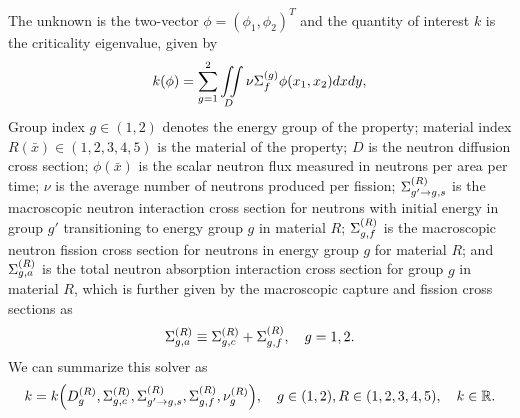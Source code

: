 The unknown is the two-vector $\phi=(\phi_1,\phi_2)^T$ and the quantity of interest $k$ is the criticality eigenvalue, given by
\begin{equation}
k(\phi)=\sum_{g=1}^2\iint\limits_D\nu\Sigma_{f}^{(g)}\phi(x_1,x_2)dxdy,
\end{equation}
Group index $g\in(1,2)$ denotes the energy group of the property; material index $R(\bar x)\in(1,2,3,4,5)$ is the material of the property; $D$ is the neutron diffusion cross section; $\phi(\bar x)$ is the scalar neutron flux measured in neutrons per area per time;  $\nu$ is the average number of neutrons produced per fission; $\Sigma_{g'\to g,s}^{(R)}$ is the macroscopic neutron interaction cross section for neutrons with initial energy in group $g'$ transitioning to energy group $g$ in material $R$; $\Sigma_{g,f}^{(R)}$ is the macroscopic neutron fission cross section for neutrons in energy group $g$ for material $R$; and $\Sigma_{g,a}^{(R)}$ is the total neutron absorption interaction cross section for group $g$ in material $R$, which is further given by the macroscopic capture and fission cross sections as
\begin{equation}
\Sigma_{g,a}^{(R)}\equiv\Sigma_{g,c}^{(R)}+\Sigma_{g,f}^{(R)},\hspace{10pt} g=1,2.
\end{equation}
We can summarize this solver as
\begin{equation}
k=k\qty(D_g^{(R)},\Sigma_{g,c}^{(R)},\Sigma_{g'\to g,s}^{(R)},\Sigma_{g,f}^{(R)},\nu_g^{(R)}),\hspace{10pt} g\in(1,2),R\in(1,2,3,4,5),\hspace{10pt}k\in\mathbb{R}.
\end{equation}
